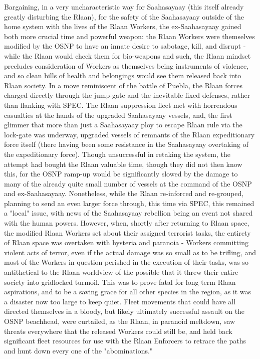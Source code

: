Bargaining, in a very uncharacteristic way for Saahasayaay (this itself already greatly disturbing the Rlaan), for the safety of the Saahasayaay outside of the home system with the lives of the Rlaan Workers, the ex-Saahasayaay gained both more crucial time and powerful weapon: the Rlaan Workers were themselves modified by the OSNP to have an innate desire to sabotage, kill, and disrupt - while the Rlaan would check them for bio-weapons and such, the Rlaan mindset precludes consideration of Workers as themselves being instruments of violence, and so clean bills of health and belongings would see them released back into Rlaan society. In a move reminiscent of the battle of Puebla, the Rlaan forces charged directly through the jump-gate and the inevitable fixed defenses, rather than flanking with SPEC. The Rlaan suppression fleet met with horrendous casualties at the hands of the upgraded Saahasayaay vessels, and, the first glimmer that more than just a Saahasayaay ploy to escape Rlaan rule via the lock-gate was underway, upgraded vessels of remnants of the Rlaan expeditionary force itself (there having been some resistance in the Saahasayaay overtaking of the expeditionary force). Though unsuccessful in retaking the system, the attempt had bought the Rlaan valuable time, though they did not then know this, for the OSNP ramp-up would be significantly slowed by the damage to many of the already quite small number of vessels at the command of the OSNP and ex-Saahasayaay. Nonetheless, while the Rlaan re-inforced and re-grouped, planning to send an even larger force through, this time via SPEC, this remained a "local" issue, with news of the Saahasayaay rebellion being an event not shared with the human powers. However, when, shortly after returning to Rlaan space, the modified Rlaan Workers set about their assigned terrorist tasks, the entirety of Rlaan space was overtaken with hysteria and paranoia - Workers committing violent acts of terror, even if the actual damage was so small as to be trifling, and most of the Workers in question perished in the execution of their tasks, was so antithetical to the Rlaan worldview of the possible that it threw their entire society into gridlocked turmoil. This was to prove fatal for long term Rlaan aspirations, and to be a saving grace for all other species in the region, as it was a disaster now too large to keep quiet. Fleet movements that could have all directed themselves in a bloody, but likely ultimately successful assault on the OSNP beachhead, were curtailed, as the Rlaan, in paranoid meltdown, saw threats everywhere that the released Workers could still be, and held back significant fleet resources for use with the Rlaan Enforcers to retrace the paths and hunt down every one of the "abominations." 

